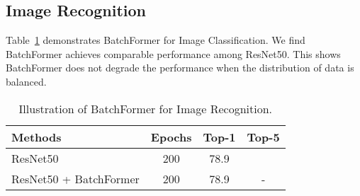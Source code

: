 \documentclass[10pt,twocolumn,letterpaper]{article}
\begin{document}
\subsection{Image Recognition}
Table~\ref{table:recognition} demonstrates BatchFormer for Image Classification. We find BatchFormer achieves comparable performance among ResNet50. This shows BatchFormer does not degrade the performance when the distribution of data is balanced.


\begin{table}[tp]
\small
\caption{Illustration of BatchFormer for Image Recognition.}
\label{table:recognition}
\centering
\begin{tabular}{@{}lccc@{}}
\hline
Methods & Epochs & Top-1 & Top-5 \\
\hline
ResNet50~\cite{rw2019timm} & 200 & 78.9 &\\
ResNet50 + BatchFormer & 200 & 78.9 & -\\
\hline
\end{tabular}
\end{table}
\end{document}
